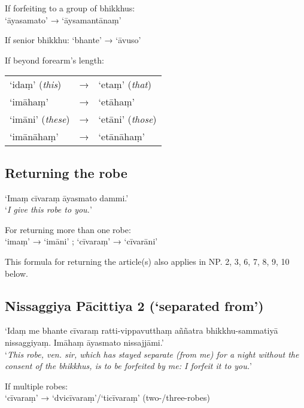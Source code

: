 If forfeiting to a group of bhikkhus:\\
‘āyasamato’ → ‘āysamantānaṃ’

If senior bhikkhu: ‘bhante’ → ‘āvuso’

If beyond forearm's length:

\begin{tabular}{@{}lll@{}}
‘idaṃ’ (\emph{this}) & → & ‘etaṃ’ (\emph{that}) \\
‘imāhaṃ’             & → & ‘etāhaṃ’             \\
‘imāni’ (\emph{these}) & → & ‘etāni’ (\emph{those})\\
‘imānāhaṃ’             & → & ‘etānāhaṃ’\\
\end{tabular}


\vspace*{-\baselineskip}

\subsection{Returning the robe}
\label{np-1-returning-the-robe}

‘Imaṃ cīvaraṃ āyasmato dammi.’\\
‘\emph{I give this robe to you.}’ 

For returning more than one robe:\\
‘imaṃ’ → ‘imāni’ ; ‘cīvaraṃ’ → ‘cīvarāni’

This formula for returning the article(s) also applies in NP. 2, 3, 6, 7, 8, 9,
10 below.

\subsection{Nissaggiya Pācittiya 2 (‘separated from’)}

‘Idaṃ me bhante cīvaraṃ ratti-vippavutthaṃ aññatra bhikkhu-sammatiyā
nissaggiyaṃ. Imāhaṃ āyasmato nissajjāmi.’\\
‘\emph{This robe, ven. sir, which has stayed separate (from me) for a night
  without the consent of the bhikkhus, is to be forfeited by me: I forfeit it to
  you.}’\\
\mbox{}

If multiple robes:\\
‘cīvaraṃ’ → ‘dvicīvaraṃ’/‘ticīvaraṃ’ (two-/three-robes)

 
